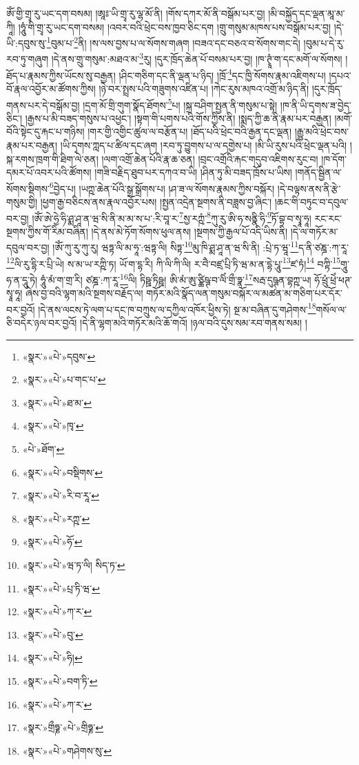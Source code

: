 ཨོཾ་གྱི་གྲྭ་རུ་ཡང་དག་བསམ། །ཨཱཿ་ཡི་གྲྭ་རུ་ལྷ་མོ་ནི། །གོས་དཀར་མོ་ནི་བསྒོམ་པར་བྱ། །མི་བསྐྱོད་དང་ལྡན་མཱ་མ་ཀཱི། །ཧཱུཾ་གི་གྲྭ་རུ་ཡང་དག་བསམ། །འབར་བའི་ཕྲེང་བས་ཁྱབ་ཅིང་དག །གྲུ་གསུམ་མཁས་པས་བསྒོམ་པར་བྱ། །དེ་ཡི་:དབུས་སུ་\footnote{«སྣར་»«པེ་»དབུས་}བུམ་པ་\footnote{«སྣར་»«པེ་»པ་གང་པ་}ནི། །ས་ལས་བྱས་པ་ལ་སོགས་གཞག །བཟའ་དང་བཅའ་བ་སོགས་གང་དེ། །བུམ་པ་དེ་རུ་རབ་ཏུ་གཞུག །དེ་ནས་གྲུ་གསུམ་:མཐའ་མ་\footnote{«སྣར་»«པེ་»ཐ་མ་}རུ། །དུར་ཁྲོད་ཆེན་པོ་བསམ་པར་བྱ། །ཁ་ཊྭཱཾ་ག་དང་མགོ་ལ་སོགས། །ཐོད་པ་རྣམས་ཀྱིས་ཡོངས་སུ་བརྒྱན། །ཤིང་གཅིག་དང་ནི་ལྡན་པ་ཉིད། །ཁྲོ་\footnote{«སྣར་»«པེ་»ཁྭ་}དང་ཁྱི་སོགས་རྣམ་འཇིགས་པ། །དཔའ་བོ་རྣལ་འབྱོར་མ་ཚོགས་ཀྱིས། །ཉེ་བར་སྤྲས་པའི་གཟུགས་འཛིན་པ། །ཀེང་རུས་མཁའ་འགྲོ་མ་ཉིད་ནི། །དུར་ཁྲོད་གནས་པར་དེ་བསྒོམ་བྱ། །དྲག་མོ་གྲི་གུག་སྣོད་ཐོགས་\footnote{«པེ་»ཐོག་}པ། །སྐྲ་བཤིག་སྤྱན་ནི་གསུམ་པ་སྟེ། །ཁ་ནི་ཡི་དྭགས་ཟ་བྱེད་ཅིང་། །རྒྱས་པ་མི་བཟད་གསུས་པ་འཕྱང་། །སྟག་གི་པགས་པའི་གོས་ཀྱིས་ནི། །སྨད་ཀྱི་ཆ་ནི་རྣམ་པར་བརྒྱན། །མགོ་བོའི་སྟེང་དུ་རྐང་པ་གཉིས། །གར་གྱི་འགྱིང་ཚུལ་ལ་བརྩོན་པ། །ཐོད་པའི་ཕྲེང་བའི་རྒྱན་དང་ལྡན། །རྒྱུ་མའི་ཕྲེང་བས་རྣམ་པར་བརྒྱན། །ཡི་དྭགས་ཀླད་པ་ཚིལ་དང་ཞག །རབ་ཏུ་བྱུགས་པ་ལ་དགྱེས་པ། །མི་ཡི་རུས་པའི་ཕྲེང་ལྡན་པའི། །སྐ་རགས་ཁྲག་གི་ཐིག་ལེ་ཅན། །ལག་འགྲོ་ཆེན་པོའི་རྣ་ཆ་ཅན། །བྲང་འགྲོའི་རྐང་གདུབ་འཇིགས་རུང་བ། །ཁ་དོག་དམར་པོ་འབར་པའི་ཚོགས། །གཟི་བརྗིད་ཐུབ་པར་དཀའ་བ་ཡི། །ཤིན་ཏུ་མི་བཟད་ཁྲོས་པ་ཡིས། །གནོད་སྦྱིན་ལ་སོགས་སྡིགས་\footnote{«སྣར་»«པེ་»བསྡིགས་}བྱེད་པ། །ཡཀྵ་ཆེན་པོའི་སྒྲ་སྒྲོགས་པ། །ཤ་ཟ་ལ་སོགས་རྣམས་ཀྱིས་བསྐོར། །དེ་བལྟས་ནས་ནི་རྩེ་གསུམ་གྱི། །ཕྱག་རྒྱ་བཅིངས་ནས་རྣལ་འབྱོར་པས། །སྤྱན་འདྲེན་སྔགས་ནི་བཟླས་བྱ་ཞིང་། །ཆང་གི་བཏུང་བ་དབུལ་བར་བྱ། །ཨོཾ་ཨེ་ཧྱེ་ཧི་ཤྨ་ཤཱ་ན་ཝ་སི་ནི་མ་མ་ས་པ་:རི་བཱ་ར་\footnote{«སྣར་»«པེ་»རི་བ་རཱ་}སྱ་རཀྵཾ་\footnote{«སྣར་»«པེ་»རཀྵ་}ཀུ་རུ་ཨི་ཧ་སནྣི་ཧི་\footnote{«སྣར་»«པེ་»ཧོ་}ཏོ་བྷ་བ་སྭཱ་ཧཱ། རང་རང་སྔགས་ཀྱིས་གོ་རིམ་བཞིན། །དེ་ནས་མེ་ཏོག་སོགས་ཕུལ་ནས། །སྔགས་ཀྱི་རྒྱལ་པོ་འདི་ཡིས་ནི། །དེ་ལ་གཏོར་མ་དབུལ་བར་བྱ། །ཨོཾ་ཀུ་རུ་ཀུ་རུ། ཝཏྟ་ལི་མ་ཧཱ་:ཝཏྟ་ལི། སིཏྟ་\footnote{«སྣར་»«པེ་»ཝ་ཏ་ལི། སིད་ཏ་}མུ་ཁི་ཤྨ་ཤཱ་ན་ཝ་སི་ནི། :པྲེ་ཏ་ཝཱ་\footnote{«སྣར་»«པེ་»པྲ་ཏི་ཝ་}ད་ནི་ཙཎྜ་:ཀ་རཱ་\footnote{«སྣར་»«པེ་»ཀ་ར་}ལི་རུ་དྷི་ར་པྲི་ཡེ། ས་མ་ཡ་རཀྵི་ཏ། ཡོ་ག་དྷ་རི། ཀི་ལི་ཀི་ལི། ར་བཻ་བཛྲ་པྲི་ཏི་ཝ་མ་ན་དྷེ་པཱུ་\footnote{«སྣར་»«པེ་»བུ་}ཛ་ཏཾ།\footnote{«སྣར་»«པེ་»ཧི།} བཀྟི་\footnote{«སྣར་»«པེ་»བག་ཏི་}གཱུ་ཧ་ན་དཱུ་ཏེ། ཧཱུཾ་མཾ་ག་གྲ་རི། ཙཎྜ་:ཀ་རཱ་\footnote{«སྣར་»«པེ་»ཀ་ར་}ལི། ཏིཥྛ་ཏིཥྛ། ཨི་མཾ་ཨུ་ཙྪིཥྚ་བ་ལིཾ་གྲྀ་ཧྣ་\footnote{«སྣར་»གྲྀཧྞ་«པེ་»གྲིཧྞ་}སརྦ་དུཥྚན་བྷཀྵ་ཡ། ཧོ་ཕྲུཾ་ཕྲེཾ་ཕཊ་སྭཱ་ཧཱ། ཞེས་བྱ་བའི་ལྷག་མའི་སྔགས་བརྗོད་ལ། གཏོར་མའི་སྣོད་ལན་གསུམ་བསྐོར་ལ་མཚན་མ་གཅིག་པར་དོར་བར་བྱའོ། །དེ་ནས་ལངས་ཏེ་ལག་པ་དང་ཁ་བཀྲུས་ལ་དཀྱིལ་འཁོར་ཕྱིས་ཏེ། སྔ་མ་བཞིན་དུ་གཤེགས་\footnote{«སྣར་»«པེ་»གཤེགས་སུ་}གསོལ་ལ་ཅི་བདེར་ཉལ་བར་བྱའོ། །དེ་ནི་ལྷག་མའི་གཏོར་མའི་ཆོ་གའོ། །ཉལ་བའི་དུས་སམ་རབ་གནས་སམ། །
